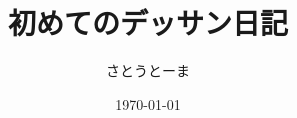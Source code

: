 \documentclass[a4paper,11pt]{jsarticle}
\begin{document}
\title{初めてのデッサン日記}
\author{さとうとーま}
\date{\today}
\maketitle
\end{document}
